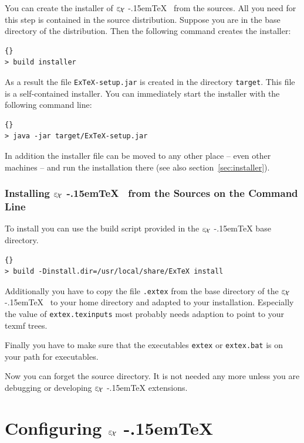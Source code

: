 \documentclass[12pt,div12,a4paper]{scrbook}
\providecommand*{\ExTeX}{\ifx\texorpdfstring\undefined
  \textrm{%
    \ensuremath{\textstyle\varepsilon_{\kern-0.15em\mathcal{X}}}%
    \kern-.15em\TeX}%
  \else\texorpdfstring{%
  \textrm{%
    \ensuremath{\textstyle\varepsilon_{\kern-0.15em\mathcal{X}}}%
    \kern-.15em\TeX
  }}{ExTeX}%
  \fi
}
\begin{document}
You can create the installer of \ExTeX\ from the sources. All you need
for this step is contained in the source distribution. Suppose you are
in the base directory of the distribution. Then the following command
creates the installer:

\begin{lstlisting}{}
> build installer
\end{lstlisting}

As a result the file \texttt{ExTeX-setup.jar} is created in the
directory \texttt{target}. This file is a self-contained installer.
You can immediately start the installer with the following command line:

\begin{lstlisting}{}
> java -jar target/ExTeX-setup.jar
\end{lstlisting}

In addition the installer file can be moved to any other place -- even
other machines -- and run the installation there (see also
section~\ref{sec:installer}).


\subsection{Installing \ExTeX\ from the Sources on the Command Line}

To install you can use the build script provided in the \ExTeX{}
base directory.

\begin{lstlisting}{}
> build -Dinstall.dir=/usr/local/share/ExTeX install
\end{lstlisting}

Additionally you have to copy the file \texttt{.extex} from the base
directory of the \ExTeX\ to your home directory and adapted to your
installation. Especially the value of \texttt{extex.texinputs} most
probably needs adaption to point to your texmf trees.

Finally you have to make sure that the executables \texttt{extex} or
\texttt{extex.bat} is on your path for executables.

Now you can forget the source directory. It is not needed any more
unless you are debugging or developing \ExTeX{} extensions.


\chapter{Configuring \ExTeX}
\end{document}

